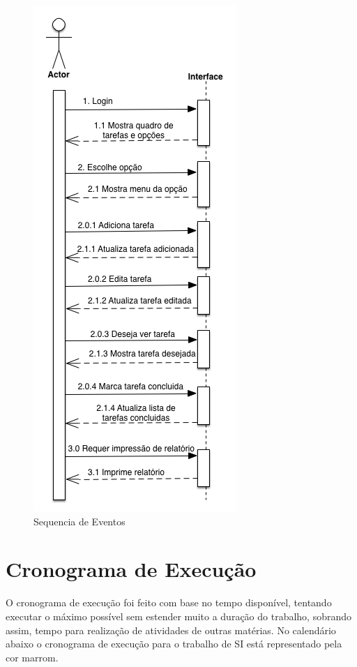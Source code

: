 \documentclass[a4paper, 12pt]{article}
\begin{document}
	\begin{figure}[H]
		\centering
		\includegraphics[scale=0.6]{eventsequence.png}
		\caption{Sequencia de Eventos}
	\end{figure}
	
	\newpage
	
	\section{Cronograma de Execução}
	
	O cronograma de execução foi feito com base no tempo disponível, tentando executar o máximo possível sem estender muito a duração do trabalho, sobrando assim, tempo para realização de atividades de outras matérias. No calendário abaixo o cronograma de execução para o trabalho de SI está representado pela cor marrom.\\\\
	
\end{document}
